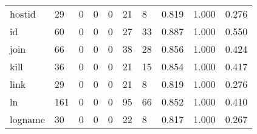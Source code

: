 \begin{longtable}{lp{1.3cm}p{1.3cm}p{1.3cm}p{1.3cm}p{1.3cm}p{1.3cm}p{1.3cm}p{1.3cm}p{1.3cm}}
hostid    &                     29 &                                             0 &                                            0 &                                           0 &                                           21 &                                          8 &                                0.819 &                                  1.000 &                                0.276 \\
id        &                     60 &                                             0 &                                            0 &                                           0 &                                           27 &                                         33 &                                0.887 &                                  1.000 &                                0.550 \\
join      &                     66 &                                             0 &                                            0 &                                           0 &                                           38 &                                         28 &                                0.856 &                                  1.000 &                                0.424 \\
kill      &                     36 &                                             0 &                                            0 &                                           0 &                                           21 &                                         15 &                                0.854 &                                  1.000 &                                0.417 \\
link      &                     29 &                                             0 &                                            0 &                                           0 &                                           21 &                                          8 &                                0.819 &                                  1.000 &                                0.276 \\
ln        &                    161 &                                             0 &                                            0 &                                           0 &                                           95 &                                         66 &                                0.852 &                                  1.000 &                                0.410 \\
logname   &                     30 &                                             0 &                                            0 &                                           0 &                                           22 &                                          8 &                                0.817 &                                  1.000 &                                0.267 \\

\end{longtable}
